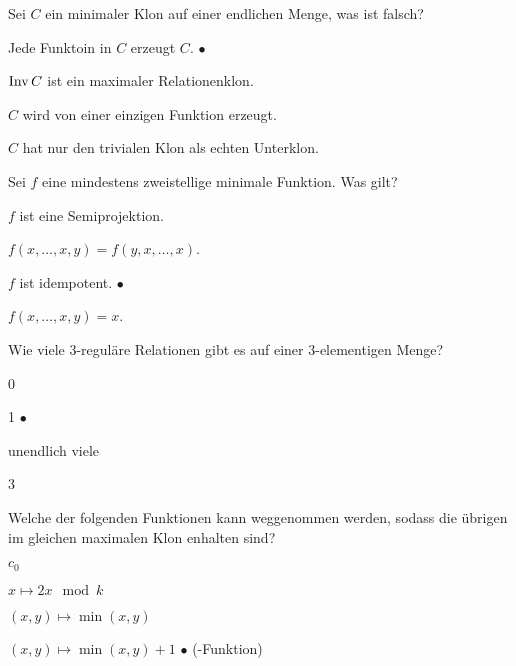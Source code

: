 \documentclass{book}
\begin{document}
\begin{exercise}
    Sei $C$ ein minimaler Klon auf einer endlichen Menge, was ist falsch?
    \begin{tasks}
            \item Jede Funktoin in $C$ erzeugt $C$. $\bullet$
            \item $\mathop\mathrm{Inv} C$ ist ein maximaler Relationenklon.
            \item $C$ wird von einer einzigen Funktion erzeugt.
            \item $C$ hat nur den trivialen Klon als echten Unterklon.
    \end{tasks}
\end{exercise}

\begin{exercise}
    Sei $f$ eine mindestens zweistellige minimale Funktion. Was gilt?
    \begin{tasks}
            \item $f$ ist eine Semiprojektion.
            \item $f(x,\ldots,x,y)=f(y,x,\ldots,x)$.
            \item $f$ ist idempotent. $\bullet$
            \item $f(x,\ldots,x,y)=x$.
    \end{tasks}
\end{exercise}

\begin{exercise}
    Wie viele $3$-reguläre Relationen gibt es auf einer $3$-elementigen Menge?
    \begin{tasks}
            \item 0
            \item 1 $\bullet$
            \item unendlich viele
            \item 3
    \end{tasks}
\end{exercise}

\begin{exercise}
    Welche der folgenden Funktionen kann weggenommen werden, sodass die übrigen im gleichen maximalen Klon enhalten sind?
    \begin{tasks}
            \item $c_0$
            \item $x\mapsto 2x \mod k$
            \item $(x,y)\mapsto\min(x,y)$
            \item $(x,y)\mapsto\min(x,y)+1$ $\bullet$ (-Funktion)
    \end{tasks}
\end{exercise}
\end{document}
